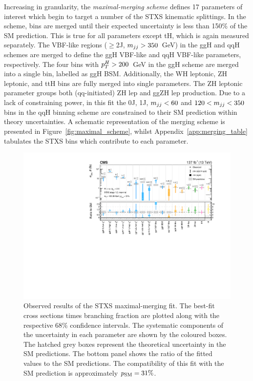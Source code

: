 Increasing in granularity, the \textit{maximal-merging scheme} defines 17 parameters of interest which begin to target a number of the STXS kinematic splittings. In the scheme, bins are merged until their expected uncertainty is less than 150\% of the SM prediction. This is true for all parameters except tH, which is again measured separately. The VBF-like regions ($\geq$2J, $m_{jj}>350$~GeV) in the ggH and qqH schemes are merged to define the ggH VBF-like and qqH VBF-like parameters, respectively. The four bins with $p_T^H>200$~GeV in the ggH scheme are merged into a single bin, labelled as ggH BSM. Additionally, the WH leptonic, ZH leptonic, and ttH bins are fully merged into single parameters. The ZH leptonic parameter groups both (qq-initiated) ZH lep and ggZH lep production. Due to a lack of constraining power, in this fit the 0J, 1J, $m_{jj}<60$ and $120<m_{jj}<350$ bins in the qqH binning scheme are constrained to their SM prediction within theory uncertainties. A schematic representation of the merging scheme is presented in Figure~\ref{fig:maximal_scheme}, whilst Appendix~\ref{app:merging_table} tabulates the STXS bins which contribute to each parameter.


\begin{figure}
  \centering
  \includegraphics[width=1\textwidth]{Figures/hgg_results/stage1p2_maximal_summary.pdf}
  \caption[Results of the maximal-merging fit]
  {
    Observed results of the STXS maximal-merging fit. The best-fit cross sections times branching fraction are plotted along with the respective 68\% confidence intervals. The systematic components of the uncertainty in each parameter are shown by the coloured boxes. The hatched grey boxes represent the theoretical uncertainty in the SM predictions. The bottom panel shows the ratio of the fitted values to the SM predictions. The compatibility of this fit with the SM prediction is approximately $p_{\rm{SM}}=31\%$. 
  }
  \label{fig:stage1p2_maximal_results}
\end{figure}

